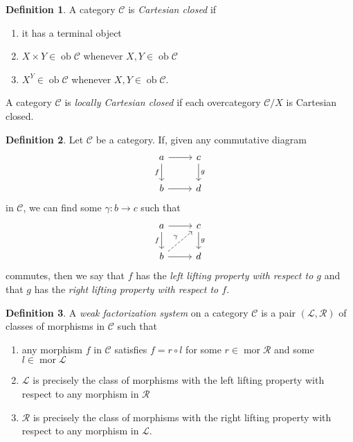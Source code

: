 \documentclass[10pt,letterpaper,cm]{nupset}
\theoremstyle{definition}
\newtheorem{definition}{Definition}[subsection]
\theoremstyle{theorem}
\theoremstyle{remark}
\newcommand{\1}{\mathbf{1}}
\renewcommand{\c}{\mathscr{C}}
\newcommand{\0}{\vec 0}
\DeclareMathOperator{\ob}{ob}
\DeclareMathOperator{\mor}{mor}
\begin{document}
\begin{definition}
A category $\c$ is \textit{Cartesian closed} if
\begin{enumerate}
\item it has a terminal object
\item $X \times Y \in \ob{\c}$ whenever $X,Y\in \ob{\c}$
\item $X^Y \in \ob{\c}$ whenever $X,Y \in \ob{\c}$.
\end{enumerate}
A category $\c$ is \textit{locally Cartesian closed} if each overcategory $\c/X$ is Cartesian closed. 
\end{definition}

\begin{definition}
Let $\c$ be a category. If, given any commutative diagram
\[
\begin{tikzcd}
a \arrow[r] \arrow[d, "f"'] & c \arrow[d, "g"] \\
b \arrow[r] & d
\end{tikzcd}
\] in $\c$, we can find some $\gamma : b \to c$ such that
\[
\begin{tikzcd}
a \arrow[r] \arrow[d, "f"'] & c \arrow[d, "g"] \\
b \arrow[r] \arrow[ru, "\gamma", dashed] & d
\end{tikzcd}
\] commutes, then we say that $f$ has the \textit{left lifting property with respect to $g$} and that $g$ has the  \textit{right lifting property with respect to $f$}.
\end{definition}

\begin{definition}
A \textit{weak factorization system} on a category $\c$ is a pair $(\mathscr{L}, \mathscr{R})$ of classes of morphisms in $\c$ such that
\begin{enumerate}
\item any morphism $f$ in $\c$ satisfies $f = r \circ l$ for some $r\in \mor{\mathscr{R}}$ and some $l\in \mor{\mathscr{L}}$
\item $\mathscr{L}$ is precisely the class of morphisms with the left lifting property with respect to any morphism in $\mathscr{R}$
\item $\mathscr{R}$ is precisely the class of morphisms with the right  lifting property with respect to any morphism in $\mathscr{L}$.
\end{enumerate}
\end{definition}
\end{document}
